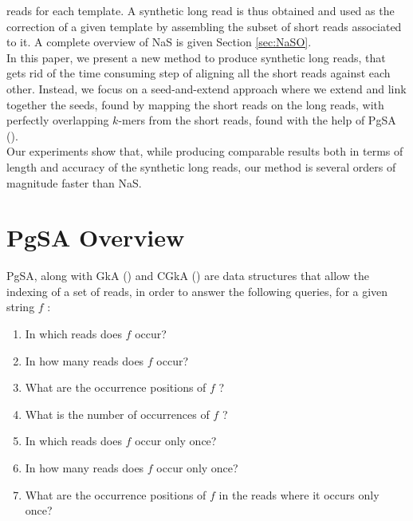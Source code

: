 \documentclass{bioinfo}
\begin{document}
reads for each template. A synthetic long read is thus obtained and used as the correction of a given template by assembling the subset of short reads
associated to it. A complete overview of NaS is given Section \ref{sec:NaSO}. \\
\indent In this paper, we present a new method to produce synthetic long reads, that gets rid of the time consuming step of aligning all
the short reads against each other. Instead, we focus on a seed-and-extend approach where we extend and link together the seeds, found by mapping
the short reads on the long reads, with perfectly overlapping $k$-mers from the short reads, found with the help of PgSA (\cite{Kowalski2015}). \\
\indent Our experiments show that, while producing comparable results both in terms of length and accuracy of the synthetic long reads, our method is several orders of magnitude faster than NaS. 


\section{PgSA Overview}
\label{sec:PgSAO}

PgSA, along with GkA (\cite{Philippe2011}) and CGkA (\cite{Niko2013}) are data structures that allow the indexing of a set of reads, in order
to answer the following queries, for a given string $f$ :

\begin{enumerate}
	\item In which reads does $f$ occur?
	\item In how many reads does $f$ occur?
	\item What are the occurrence positions of $f$ ?
	\item What is the number of occurrences of $f$ ?
	\item In which reads does $f$ occur only once?
	\item In how many reads does $f$ occur only once?
	\item What are the occurrence positions of $f$ in the reads where it occurs only once?
\end{enumerate}
\end{document}
